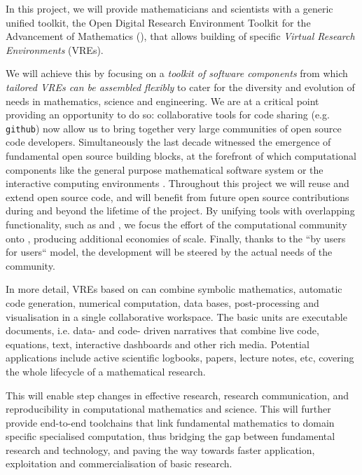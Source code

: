 In this project, we will provide mathematicians and scientists with a
generic unified toolkit, the Open Digital Research Environment Toolkit
for the Advancement of Mathematics (\TheProject), that allows
building of specific \emph{Virtual Research Environments} (VREs).


We will achieve this by focusing on a \emph{toolkit of software
  components} from which \emph{tailored VREs can be assembled
  flexibly} to cater for the diversity and evolution of needs in
mathematics, science and engineering.  We are at a critical point providing
an opportunity to do so: collaborative tools for code sharing (e.g.
\texttt{github}) now allow us to bring together very large communities
of open source code developers.%
Simultaneously the last decade witnessed the emergence of fundamental
open source building blocks, at the forefront of which computational
components like the general purpose mathematical software system \Sage
or the interactive computing environments \Jupyter.
Throughout this project we will reuse and extend open source code, and
\TheProject will benefit from future open source contributions during
and beyond the lifetime of the project. By unifying tools with
overlapping functionality, such as \Jupyter and \Sage, we focus the
effort of the computational community onto \TheProject, producing
additional economies of scale. Finally, thanks to the ``by users for
users`` model, the development will be steered by the actual needs of
the community.

In more detail, VREs based on \TheProject can combine symbolic
mathematics, automatic code generation, numerical computation, data
bases, post-processing and visualisation in a single collaborative
workspace. The basic units are executable documents, i.e. data- and
code- driven narratives that combine live code, equations, text,
interactive dashboards and other rich media. Potential applications
include active scientific logbooks, papers, lecture notes, etc,
covering the whole lifecycle of a mathematical research.

This will enable step changes in effective research, research
communication, and reproducibility in computational mathematics and
science. This will further provide end-to-end toolchains that link
fundamental mathematics to domain specific specialised computation,
thus bridging the gap between fundamental research and technology, and
paving the way towards faster application, exploitation and
commercialisation of basic research.

